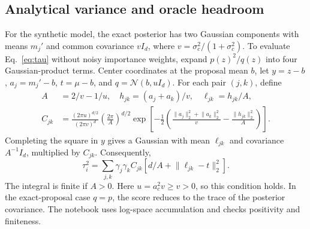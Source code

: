 \documentclass[10pt,letterpaper]{article}
\newcommand{\N}{\mathcal N}
\newcommand{\norm}[1]{\lVert #1\rVert_2}
\begin{document}
\subsection{Analytical variance and oracle headroom}
For the synthetic model, the exact posterior has two Gaussian components with means $m_j'$ and common covariance $vI_d$, where $v=\sigma_c^2/(1+\sigma_c^2)$. To evaluate Eq.~\eqref{eq:tau} without noisy importance weights, expand $p(z)^2/q(z)$ into four Gaussian-product terms. Center coordinates at the proposal mean $b$, let $y=z-b$, $a_j=m_j'-b$, $t=\mu-b$, and $q=\N(b,u I_d)$. For each pair $(j,k)$, define
\begin{align}
 A&=2/v-1/u,\quad h_{jk}=(a_j+a_k)/v,\quad \ell_{jk}=h_{jk}/A,\\
 C_{jk}&=\frac{(2\pi u)^{d/2}}{(2\pi v)^d}\left(\frac{2\pi}{A}\right)^{d/2}
 \exp\!\left[-\frac12\left(\frac{\norm{a_j}^2+\norm{a_k}^2}{v}-\frac{\norm{h_{jk}}^2}{A}\right)\right].
\end{align}
Completing the square in $y$ gives a Gaussian with mean $\ell_{jk}$ and covariance $A^{-1}I_d$, multiplied by $C_{jk}$. Consequently,
\begin{equation}
 {\tau_i^2=\sum_{j,k}\gamma_j\gamma_k C_{jk}\left[d/A+\norm{\ell_{jk}-t}^{2}\right].}
\end{equation}
The integral is finite if $A>0$. Here $u=a_c^2v\geq v>0$, so this condition holds. In the exact-proposal case $q=p$, the score reduces to the trace of the posterior covariance. The notebook uses log-space accumulation and checks positivity and finiteness.
\end{document}
